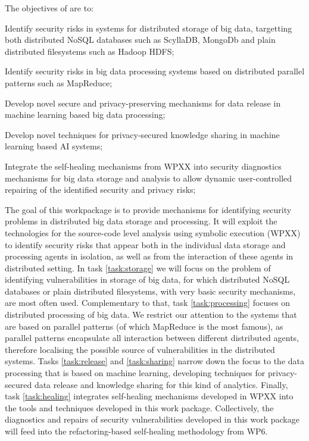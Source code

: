 \addtocounter{wpno}{1}
\begin{Workpackage}{\thewpno}
\WPTitle{\wpname{\thewpno}}


\begin{WPObjectives}
The objectives of \theWP{} are to:
\begin{compactitem}
\item Identify security risks in systems for distributed storage of big data, targetting both distributed NoSQL databases such as ScyllaDB, MongoDb and plain distributed filesystems such as Hadoop HDFS; 
\item Identify security risks in big data processing systems based on distributed parallel patterns such as MapReduce;
\item Develop novel secure and privacy-preserving mechanisms for data release in machine learning based big data processing; 
\item Develop novel techniques for privacy-secured knowledge sharing in machine learning based AI systems; 
\item Integrate the self-healing mechanisms from WPXX into security diagnostics mechanisms for big data storage and analysis to allow dynamic user-controlled repairing of the identified security and privacy risks;  
\end{compactitem}
\end{WPObjectives}

\begin{WPDescription}
  The goal of this workpackage is to provide mechanisms for identifying security problems in distributed big data storage and processing. It will exploit the technologies for the source-code level analysis using symbolic execution (WPXX) to identify security risks that appear both in the individual data storage and processing agents in isolation, as well as from the interaction of these agents in distributed setting. In task \ref{task:storage} we will focus on the problem of identifying vulnerabilities in storage of big data, for which distributed NoSQL databases or plain distributed filesystems, with very basic security mechanisms, are most often used. Complementary to that, task \ref{task:processing} focuses on distributed processing of big data. We restrict our attention to the systems that are based on parallel patterns (of which MapReduce is the most famous), as parallel patterns encapsulate all interaction between different distributed agents, therefore localising the possible source of vulnerabilities in the distributed systems. Tasks \ref{task:release} and \ref{task:sharing} narrow down the focus to the data processing that is based on machine learning, developing techniques for privacy-secured data release and knowledge sharing for this kind of analytics. Finally, task \ref{task:healing} integrates self-healing mechanisms developed in WPXX into the tools and techniques developed in this work package. Collectively, the diagnostics and repairs of security vulnerabilities developed in this work package will feed into the refactoring-based self-healing methodology from WP6. 
\end{WPDescription}


\end{Workpackage}

